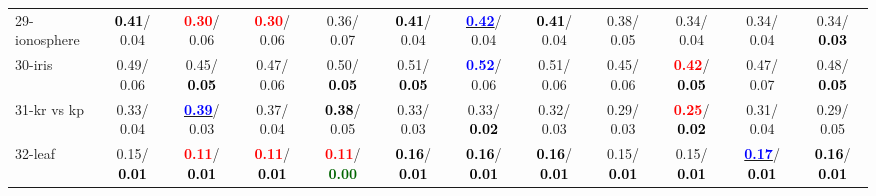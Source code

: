 \begin{table}[h]
\begin{center}
{\begin{tabular}{lc|c|c|c|c|c|c|c|c|c|c}
29-ionosphere & \textcolor{black}{\textbf{  0.41}}/  0.04 & \textcolor{red}{\textbf{  0.30}}/  0.06 & \textcolor{red}{\textbf{  0.30}}/  0.06 &   0.36/  0.07 & \textcolor{black}{\textbf{  0.41}}/  0.04 & \underline{\textcolor{blue}{\textbf{  0.42}}}/  0.04 & \textcolor{black}{\textbf{  0.41}}/  0.04 &   0.38/  0.05 &   0.34/  0.04 &   0.34/  0.04 &   0.34/\textcolor{black}{\textbf{  0.03}} \\
30-iris &   0.49/  0.06 &   0.45/\textcolor{black}{\textbf{  0.05}} &   0.47/  0.06 &   0.50/\textcolor{black}{\textbf{  0.05}} &   0.51/\textcolor{black}{\textbf{  0.05}} & \textcolor{blue}{\textbf{  0.52}}/  0.06 &   0.51/  0.06 &   0.45/  0.06 & \textcolor{red}{\textbf{  0.42}}/\textcolor{black}{\textbf{  0.05}} &   0.47/  0.07 &   0.48/\textcolor{black}{\textbf{  0.05}} \\
31-kr vs kp &   0.33/  0.04 & \underline{\textcolor{blue}{\textbf{  0.39}}}/  0.03 &   0.37/  0.04 & \textcolor{black}{\textbf{  0.38}}/  0.05 &   0.33/  0.03 &   0.33/\textcolor{black}{\textbf{  0.02}} &   0.32/  0.03 &   0.29/  0.03 & \textcolor{red}{\textbf{  0.25}}/\textcolor{black}{\textbf{  0.02}} &   0.31/  0.04 &   0.29/  0.05 \\
32-leaf &   0.15/\textcolor{black}{\textbf{  0.01}} & \textcolor{red}{\textbf{  0.11}}/\textcolor{black}{\textbf{  0.01}} & \textcolor{red}{\textbf{  0.11}}/\textcolor{black}{\textbf{  0.01}} & \textcolor{red}{\textbf{  0.11}}/\textcolor{darkgreen}{\textbf{  0.00}} & \textcolor{black}{\textbf{  0.16}}/\textcolor{black}{\textbf{  0.01}} & \textcolor{black}{\textbf{  0.16}}/\textcolor{black}{\textbf{  0.01}} & \textcolor{black}{\textbf{  0.16}}/\textcolor{black}{\textbf{  0.01}} &   0.15/\textcolor{black}{\textbf{  0.01}} &   0.15/\textcolor{black}{\textbf{  0.01}} & \underline{\textcolor{blue}{\textbf{  0.17}}}/\textcolor{black}{\textbf{  0.01}} & \textcolor{black}{\textbf{  0.16}}/\textcolor{black}{\textbf{  0.01}} \\\end{tabular}
}\label{strats0bCIELM}
\end{center}
\end{table}
